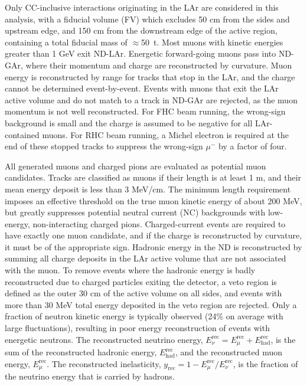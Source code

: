 Only CC-inclusive interactions originating in the LAr are considered in this analysis, with a fiducial volume (FV) which excludes 50 cm from the sides and upstream edge, and 150 cm from the downstream edge of the active region, containing a total fiducial mass of $\approx$50~t. Most muons with kinetic energies greater than 1 GeV exit ND-LAr. Energetic forward-going muons pass into ND-GAr, where their momentum and charge are reconstructed by curvature. Muon energy is reconstructed by range for tracks that stop in the LAr, and the charge cannot be determined event-by-event. Events with muons that exit the LAr active volume and do not match to a track in ND-GAr are rejected, as the muon momentum is not well reconstructed. For FHC beam running, the wrong-sign background is small and the charge is assumed to be negative for all LAr-contained muons. For RHC beam running, a Michel electron is required at the end of these stopped tracks to suppress the wrong-sign $\mu^-$ by a factor of four.

All generated muons and charged pions are evaluated as potential muon candidates. Tracks are classified as muons if their length is at least 1 m, and their mean energy deposit is less than 3 MeV/cm. The minimum length requirement imposes an effective threshold on the true muon kinetic energy of about 200 MeV, but greatly suppresses potential neutral current (NC) backgrounds with low-energy, non-interacting charged pions. Charged-current events are required to have exactly one muon candidate, and if the charge is reconstructed by curvature, it must be of the appropriate sign. Hadronic energy in the ND is reconstructed by summing all charge deposits in the LAr active volume that are not associated with the muon. To remove events where the hadronic energy is badly reconstructed due to charged particles exiting the detector, a veto region is defined as the outer 30 cm of the active volume on all sides, and events with more than 30 MeV total energy deposited in the veto region are rejected. Only a fraction of neutron kinetic energy is typically observed (24\% on average with large fluctuations), resulting in poor energy reconstruction of events with energetic neutrons. The reconstructed neutrino energy, $E_{\nu}^{\mathrm{rec}} = E_{\mu}^{\mathrm{rec}} + E_{\mathrm{had}}^{\mathrm{rec}}$, is the sum of the reconstructed hadronic energy, $E_{\mathrm{had}}^{\mathrm{rec}}$, and the reconstructed muon energy, $E_{\mu}^{\mathrm{rec}}$. The reconstructed inelasticity, $y_{\mathrm{rec}} = 1 - E_{\mu}^{\mathrm{rec}}/E_{\nu}^{\mathrm{rec}}$, is the fraction of the neutrino energy that is carried by hadrons.

